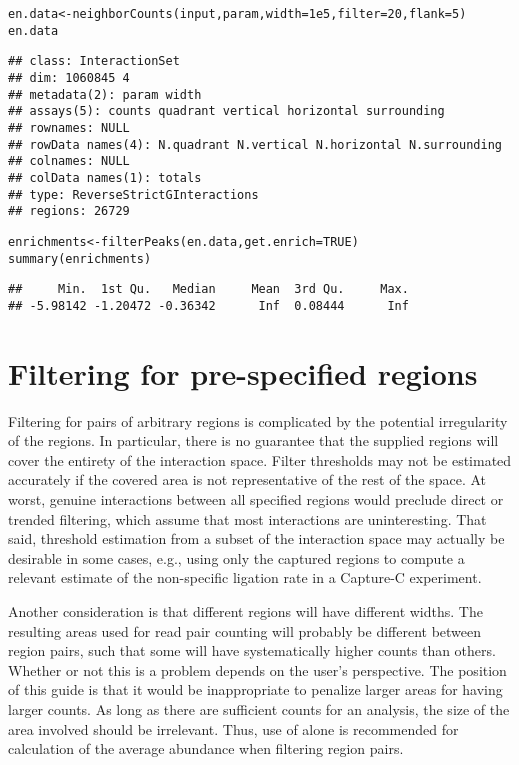\documentclass{report}\usepackage[]{graphicx}\usepackage[usenames,dvipsnames]{color}
\newcommand{\hlnum}[1]{\textcolor[rgb]{0.816,0.125,0.439}{#1}}%
\newcommand{\hlstd}[1]{\textcolor[rgb]{0.251,0.251,0.251}{#1}}%
\newcommand{\hlkwb}[1]{\textcolor[rgb]{0,0,0}{#1}}%
\newcommand{\hlkwc}[1]{\textcolor[rgb]{0.251,0.251,0.251}{#1}}%
\newcommand{\hlkwd}[1]{\textcolor[rgb]{0.878,0.439,0.125}{#1}}%
\newenvironment{knitrout}{}{} %
\begin{document}
\begin{knitrout}
\color{fgcolor}\begin{kframe}
\begin{alltt}
\hlstd{en.data} \hlkwb{<-} \hlkwd{neighborCounts}\hlstd{(input, param,} \hlkwc{width}\hlstd{=}\hlnum{1e5}\hlstd{,} \hlkwc{filter}\hlstd{=}\hlnum{20}\hlstd{,} \hlkwc{flank}\hlstd{=}\hlnum{5}\hlstd{)}
\hlstd{en.data}
\end{alltt}
\begin{verbatim}
## class: InteractionSet 
## dim: 1060845 4 
## metadata(2): param width
## assays(5): counts quadrant vertical horizontal surrounding
## rownames: NULL
## rowData names(4): N.quadrant N.vertical N.horizontal N.surrounding
## colnames: NULL
## colData names(1): totals
## type: ReverseStrictGInteractions
## regions: 26729
\end{verbatim}
\begin{alltt}
\hlstd{enrichments} \hlkwb{<-} \hlkwd{filterPeaks}\hlstd{(en.data,} \hlkwc{get.enrich}\hlstd{=}\hlnum{TRUE}\hlstd{)}
\hlkwd{summary}\hlstd{(enrichments)}
\end{alltt}
\begin{verbatim}
##     Min.  1st Qu.   Median     Mean  3rd Qu.     Max. 
## -5.98142 -1.20472 -0.36342      Inf  0.08444      Inf
\end{verbatim}
\end{kframe}
\end{knitrout}

\section{Filtering for pre-specified regions}
Filtering for pairs of arbitrary regions is complicated by the potential irregularity of the regions.
In particular, there is no guarantee that the supplied regions will cover the entirety of the interaction space.
Filter thresholds may not be estimated accurately if the covered area is not representative of the rest of the space.
At worst, genuine interactions between all specified regions would preclude direct or trended filtering, which assume that most interactions are uninteresting.
That said, threshold estimation from a subset of the interaction space may actually be desirable in some cases, e.g., using only the captured regions to compute a relevant estimate of the non-specific ligation rate in a Capture-C experiment.

Another consideration is that different regions will have different widths.
The resulting areas used for read pair counting will probably be different between region pairs, such that some will have systematically higher counts than others.
Whether or not this is a problem depends on the user's perspective.
The position of this guide is that it would be inappropriate to penalize larger areas for having larger counts. 
As long as there are sufficient counts for an analysis, the size of the area involved should be irrelevant.
Thus, use of  alone is recommended for calculation of the average abundance when filtering region pairs.
\end{document}
